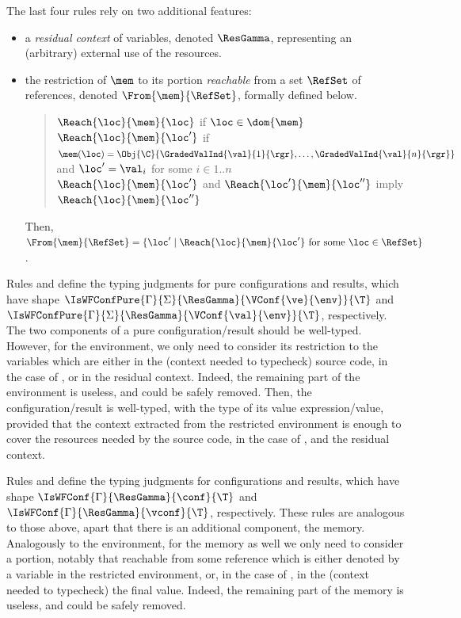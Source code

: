 The last four rules rely on two additional features:
\begin{itemize}
\item a \emph{residual context} of variables, denoted $\ResGamma$, representing an (arbitrary) external use of the resources. 
\item the restriction of $\mem$ to its portion \emph{reachable} from a set $\RefSet$ of references, denoted  $\From{\mem}{\RefSet}$, formally defined below. 
\begin{quote}
$\Reach{\loc}{\mem}{\loc}$ if $\loc\in\dom{\mem}$\\
$\Reach{\loc}{\mem}{\loc'}$ if $\mem(\loc)=\Obj{\C}{\GradedValInd{\val}{1}{\rgr},\ldots,\GradedValInd{\val}{n}{\rgr}}$ and $\loc'=\val_i$ for some $i\in 1..n$\\
$\Reach{\loc}{\mem}{\loc'}$ and $\Reach{\loc'}{\mem}{\loc''}$ imply $\Reach{\loc}{\mem}{\loc''}$
\end{quote}
Then, $\From{\mem}{\RefSet}=\{\loc'\mid\Reach{\loc}{\mem}{\loc'}\ \mbox{for some}\ \loc\in\RefSet\}$.
\end{itemize}

Rules  and  define the typing judgments for pure configurations and results, which have shape $\IsWFConfPure{\Gamma}{\Sigma}{\ResGamma}{\VConf{\ve}{\env}}{\T}$ and $\IsWFConfPure{\Gamma}{\Sigma}{\ResGamma}{\VConf{\val}{\env}}{\T}$, respectively. The two components of a pure configuration/result should be well-typed. However, for the environment, we only need to consider its restriction to the variables which are either in the (context needed to typecheck) source code, in the case of , or in the residual context. Indeed, the remaining part of the environment is useless, and could be safely removed. 
Then, the configuration/result is well-typed, with the type of its value expression/value, provided that the context extracted from the  restricted environment is enough to cover the resources needed by the source code, in the case of , and  the residual context.

Rules  and  define the typing  judgments for configurations and results, which have shape $\IsWFConf{\Gamma}{\ResGamma}{\conf}{\T}$ and 
$\IsWFConf{\Gamma}{\ResGamma}{\vconf}{\T}$, respectively. 
These rules are analogous to those above, apart that there is an additional component, the memory. Analogously to the environment, for the memory as well we only need to consider a portion, notably that reachable from some reference which is either denoted by a variable in the restricted environment, or, in the case of , in the (context needed to typecheck) the final value. Indeed, the remaining part of the memory is useless, and could be safely removed. 

